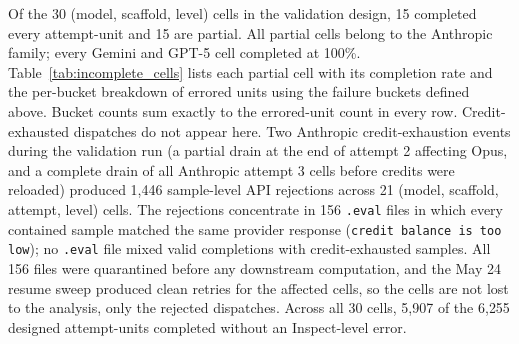 \documentclass[10pt]{article} %
\begin{document}
    Of the 30 (model, scaffold, level) cells in the validation design, 15 completed every attempt-unit and 15 are partial. All partial cells belong to the Anthropic family; every Gemini and GPT-5 cell completed at 100\%. Table~\ref{tab:incomplete_cells} lists each partial cell with its completion rate and the per-bucket breakdown of errored units using the failure buckets defined above. Bucket counts sum exactly to the errored-unit count in every row. Credit-exhausted dispatches do not appear here. Two Anthropic credit-exhaustion events during the validation run (a partial drain at the end of attempt 2 affecting Opus, and a complete drain of all Anthropic attempt 3 cells before credits were reloaded) produced 1{,}446 sample-level API rejections across 21 (model, scaffold, attempt, level) cells. The rejections concentrate in 156 \texttt{.eval} files in which every contained sample matched the same provider response (\texttt{credit balance is too low}); no \texttt{.eval} file mixed valid completions with credit-exhausted samples. All 156 files were quarantined before any downstream computation, and the May 24 resume sweep produced clean retries for the affected cells, so the cells are not lost to the analysis, only the rejected dispatches. Across all 30 cells, 5{,}907 of the 6{,}255 designed attempt-units completed without an Inspect-level error.
\end{document}
